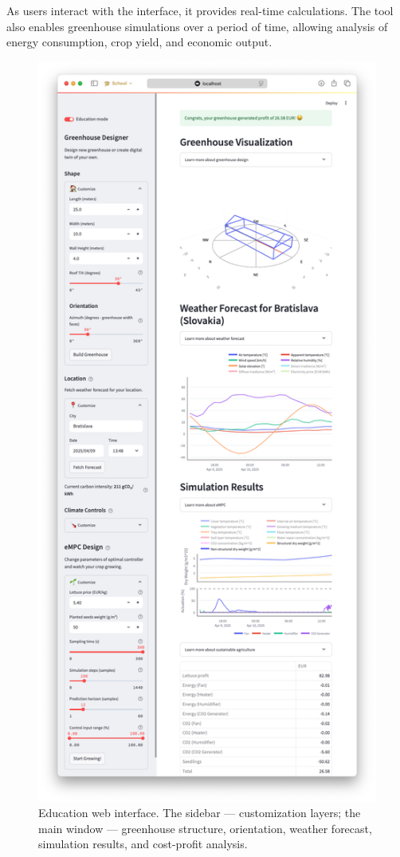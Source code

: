 \documentclass[conference]{IEEEtran}
\begin{document}
As users interact with the interface, it provides real-time calculations. The tool also enables greenhouse simulations over a period of time, allowing analysis of energy consumption, crop yield, and economic output.
\begin{figure}\label{fig:web}
    \centering
    \includegraphics[width=\linewidth, trim=50 50 50 50]{figures/webpage.png}
    \caption{Education web interface. The sidebar ---  customization layers; the main window --- greenhouse structure, orientation, weather forecast, simulation results, and cost-profit analysis.}
\end{figure}
\end{document}
